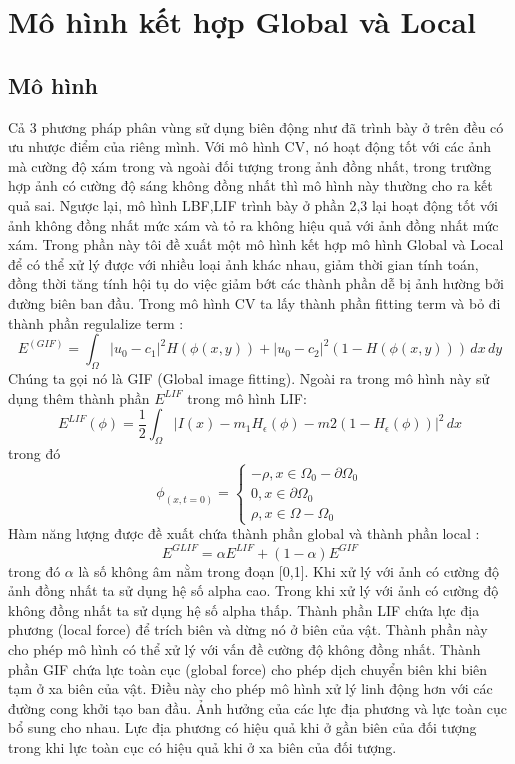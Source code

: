 \documentclass[12pt,oneside,a4]{report}
\begin{document}
\section{Mô hình kết hợp Global và Local}
\subsection{Mô hình}
Cả 3 phương pháp phân vùng sử dụng biên động như đã trình bày ở trên đều có ưu nhược điểm của riêng mình. Với mô hình CV, nó hoạt động tốt với các ảnh mà cường độ xám trong và ngoài đối tượng trong ảnh đồng nhất, trong trường hợp  ảnh có cường độ sáng không đồng nhất thì mô hình này thường cho ra kết quả sai. Ngược lại, mô hình LBF,LIF trình bày ở phần 2,3 lại hoạt động tốt với ảnh không đồng nhất mức xám và tỏ ra không hiệu quả với ảnh đồng nhất mức xám. Trong phần này tôi đề xuất một mô hình kết hợp mô hình Global và Local để có thể xử lý được với nhiều loại ảnh khác nhau, giảm thời gian tính toán, đồng thời tăng tính hội tụ do việc giảm bớt các thành phần dễ bị ảnh hường bởi đường biên ban đầu. Trong mô hình CV ta lấy thành phần fitting term và bỏ đi thành phần regulalize term :
\begin{equation}
E^(GIF)=\int_{\Omega} |u_0-c_1|^2H(\phi(x,y))+ |u_0-c_2|^2(1-H(\phi(x,y))) \,dx\,dy
\end{equation} 
Chúng ta gọi nó là GIF (Global image fitting). Ngoài ra trong mô hình này sử dụng thêm thành phần $E^{LIF}$ trong mô hình LIF:
\begin{equation}
E^{LIF}(\phi)=\dfrac{1}{2}\int_{\Omega}|I(x)-m_1H_{\epsilon}(\phi)-m2(1-H_{\epsilon}(\phi))|^2\,dx
\end{equation}
trong đó 
\begin{equation}
\phi_(x,t=0)=\begin{cases}
-\rho, x\in \Omega_0 -\partial \Omega_0\\
0, x\in \partial \Omega_0\\
\rho, x\in \Omega- \Omega_0
\end{cases}
\end{equation}
Hàm năng lượng được đề xuất chứa thành phần global và thành phần local :
\begin{equation}
E^{GLIF}=\alpha E^{LIF}+(1-\alpha)E^{GIF}
\end{equation}
trong đó $\alpha$ là số không âm nằm trong đoạn [0,1]. Khi xử lý với ảnh có cường độ ảnh đồng nhất ta sử dụng hệ số alpha cao. Trong khi xử lý với ảnh có cường độ không đồng nhất ta sử dụng hệ số alpha thấp. Thành phần LIF chứa lực địa phương (local force) để trích biên và dừng nó ở biên của vật. Thành phần này cho phép mô hình có thể xử lý với vấn đề cường độ không đồng nhất. Thành phần GIF chứa lực toàn cục (global force) cho phép dịch chuyển biên khi biên tạm ở xa biên của vật. Điều này cho phép mô hình xử lý linh động hơn với các đường cong khởi tạo ban đầu.
Ảnh hưởng của các lực địa phương và lực toàn cục bổ sung cho nhau. Lực địa phương có hiệu quả khi ở gần biên của đối tượng trong khi lực toàn cục có hiệu quả khi ở xa biên của đối tượng. 
\end{document}

